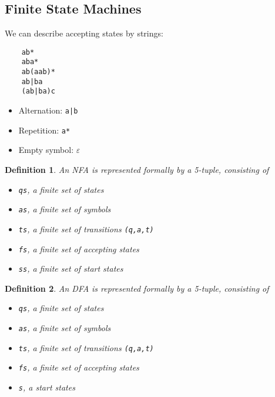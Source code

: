 \documentclass{article}
\theoremstyle{sltheorem}
\newtheorem{definition}{Definition}
\begin{document}
\subsection{Finite State Machines}
We can describe accepting states by strings:
\begin{verbatim}
    ab*
    aba*
    ab(aab)*
    ab|ba
    (ab|ba)c
\end{verbatim}
\begin{itemize}
    \item Alternation: \texttt{a|b}
    \item Repetition: \texttt{a*}
    \item Empty symbol: $\varepsilon$
\end{itemize}
\begin{definition}
    An NFA is represented formally by a 5-tuple, consisting of
    \begin{itemize}
        \item \texttt{qs}, a finite set of states
        \item \texttt{as}, a finite set of symbols
        \item \texttt{ts}, a finite set of transitions \texttt{(q,a,t)}
        \item \texttt{fs}, a finite set of accepting states
        \item \texttt{ss}, a finite set of start states
    \end{itemize}
\end{definition}
\begin{definition}
    An DFA is represented formally by a 5-tuple, consisting of
    \begin{itemize}
        \item \texttt{qs}, a finite set of states
        \item \texttt{as}, a finite set of symbols
        \item \texttt{ts}, a finite set of transitions \texttt{(q,a,t)}
        \item \texttt{fs}, a finite set of accepting states
        \item \texttt{s}, a start states
    \end{itemize}
\end{definition}
\end{document}
